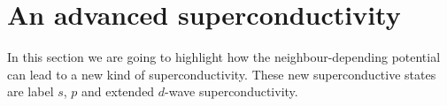 \documentclass[../main.tex]{subfile}
\begin{document}
\section{An advanced superconductivity}
In this section we are going to highlight how the neighbour-depending potential can lead to a new kind of superconductivity.
These new superconductive states are label $s$, $p$ and extended $d$-wave superconductivity.
\end{document}

